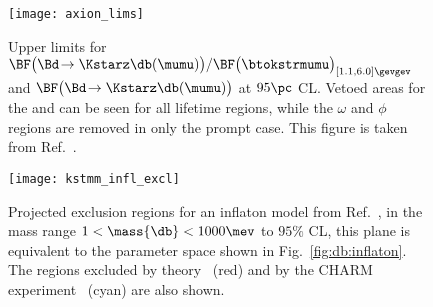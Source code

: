 \begin{figure}
  \begin{center}
    \texttt{[image: axion\_lims]}
    \caption[Projected sensitivity in an inflaton search]
    {
      Upper limits for
      $\BF\big(\Bd\!\to\Kstarz\db(\mumu)\big) / \BF\big(\btokstrmumu\big)_{[1.1,6.0]\gevgev}$
      and $\BF\big(\Bd\!\to\Kstarz\db(\mumu)\big)$ at $95\pc$ CL.
      Vetoed areas for the \jpsi and \psitwos can be seen for all lifetime regions, while the
      $\omega$ and $\phi$ regions are removed in only the prompt case.
      This figure is taken from Ref.~\protect\cite{LHCb-PAPER-2015-036}.
    }
    \label{fig:db:excl:infl}
  \end{center}
\end{figure}


\begin{figure}
  \begin{center}
    \texttt{[image: kstmm\_infl\_excl]}
    \caption[Projected sensitivity in an inflaton search]
    {
      Projected exclusion regions for an inflaton model from Ref.~\protect\cite{Bezrukov:2014nza},
      in the mass range $1<\mass{\db}<1000\mev$ to $95\%$ CL, this plane is
      equivalent to the parameter space shown in Fig.~\protect\ref{fig:db:inflaton}.
      The regions excluded by theory~\cite{Bezrukov:2014nza} (red) and by the CHARM
      experiment~\cite{Bergsma:1985qz} (cyan) are also shown.
    }
    \label{fig:db:excl:infl:model}
  \end{center}
\end{figure}






